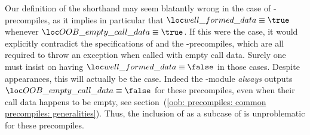 \begin{description}
\begin{description}
\begin{description}
						\saNote{}\label{hub: instruction handling: call: precompiles: common: generalities: empty call data in well formed data shorthand for BLS precompiles and P256Verify}
						Our definition of the \locWellFormedData{} shorthand may seem blatantly wrong in the case of
						-precompiles, as it implies in particular that
						$\locWellFormedData \equiv \true$ whenever $\locOobResultEmptyCallData \equiv \true$.
						If this were the case, it would explicitly contradict the specifications of \instPointEvaluation{} and the -precompiles,
						which are all required to throw an exception when called with empty call data.
						Surely one must insist on having $\locWellFormedData{} \equiv \false$ in those cases.
						Despite appearances, this will actually be the case.
						Indeed the \oobMod{}-module \emph{always} outputs $\locOobResultEmptyCallData \equiv \false$ for these precompiles,
						even when their call data happens to be empty,
						see section~(\ref{oob: precompiles: common precompiles: generalities}).
						Thus, the inclusion of \locOobResultEmptyCallData{} as a subcase of \locWellFormedData{} is unproblematic for these precompiles.


\end{description}
\end{description}
\end{description}
